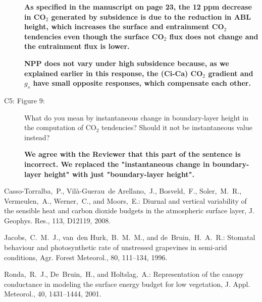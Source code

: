 \documentclass[10pt,a4paper,notitlepage,twoside]{article}
\begin{document}
\begin{description}
\textbf{As specified in the manuscript on page 23, the 12 ppm decrease in CO$_2$ generated by subsidence is due to the reduction in ABL height, which increases the surface and entrainment CO$_2$ tendencies even though the surface CO$_2$ flux does not change and the entrainment flux is lower.}

\textbf{NPP does not vary under high subsidence because, as we explained earlier in this response, the (Ci-Ca) CO$_2$ gradient and $g_s$ have small opposite responses, which compensate each other.}

\item[C5: Figure 9:] What do you mean by instantaneous change in boundary-layer height in the
computation of CO$_2$ tendencies? Should it not be instantaneous value instead?

\textbf{We agree with the Reviewer that this part of the sentence is incorrect. We replaced the "instantaneous change in boundary-layer height" with just "boundary-layer height".}

\end{description}

\begin{thebibliography}{88}

 Casso-Torralba,~P.,
  Vil{\`a}-Guerau~de Arellano,~J., Bosveld,~F., Soler,~M.~R.,
  Vermeulen,~A., Werner,~C., and Moors,~E.: {Diurnal and vertical
    variability of the sensible heat and carbon dioxide budgets in the
    atmospheric surface layer}, J. Geophys. Res., 113, D12119, 2008.

 Jacobs,~C.~M.~J., van~den Hurk,~B.~M.~M.,
  and de~Bruin,~H.~A.~R.: {Stomatal behaviour and photosynthetic rate
    of unstressed grapevines in semi-arid conditions}, Agr. Forest
  Meteorol., 80, 111--134, 1996.

 Ronda,~R.~J., De~Bruin,~H., and
  Holtslag,~A.: {Representation of the canopy conductance in modeling
    the surface energy budget for low vegetation}, J. Appl. Meteorol.,
  40, 1431--1444, 2001.

\end{thebibliography}
\end{document}
